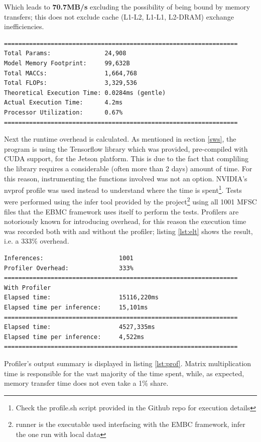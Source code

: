 \documentclass{article}
\begin{document}
Which leads to \textbf{70.7MB/s} excluding the possibility of being bound by memory transfers; this does not exclude cache (L1-L2, L1-L1, L2-DRAM) exchange inefficiencies.

\begin{lstlisting}[caption=Computations Summary]
=================================================================
Total Params:               24,908
Model Memory Footprint:     99,632B
Total MACCs:                1,664,768
Total FLOPs:                3,329,536
Theoretical Execution Time: 0.0284ms (gentle)
Actual Execution Time:      4.2ms
Processor Utilization:      0.67%
=================================================================
\end{lstlisting}\label{lst:footprint}

Next the runtime overhead is calculated. As mentioned in section \ref{sws}, the program is using the Tensorflow library which was provided, pre-compiled with CUDA support, for the Jetson platform. This is due to the fact that compliling the library requires a considerable (often more than 2 days) amount of time. For this reason, instrumenting the functions involved was not an option. NVIDIA's nvprof profile was used instead to understand where the time is spent\footnote{Check the profile.sh script provided in the Github repo for execution details}. Tests were performed using the infer tool provided by the project\footnote{runner is the executable used interfacing with the EMBC framework, infer the one run with local data} using all 1001 MFSC files that the EBMC framework uses itself to perform the tests. Profilers are notoriously known for introducing overhead, for this reason the execution time was recorded both with and without the profiler; listing \ref{lst:elt} shows the result, i.e. a \(333\%\) overhead.

\begin{lstlisting}[caption=Infer tool execution time with and without profiler]
Inferences:                     1001
Profiler Overhead:              333%
=================================================================
With Profiler
Elapsed time:                   15116,220ms
Elapsed time per inference:     15,101ms
=================================================================
Elapsed time:                   4527,335ms
Elapsed time per inference:     4,522ms
=================================================================
\end{lstlisting}\label{lst:elt}

Profiler's output summary is displayed in listing \ref{lst:prof}. Matrix multiplication time is responsible for the vast majority of the time spent, while, as expected, memory transfer time does not even take a 1\% share.
\end{document}
